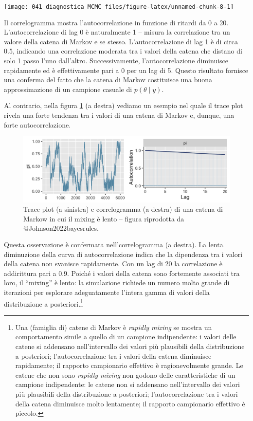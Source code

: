 \documentclass[
  11pt,
  italian,
  a4paper,
  extrafontsizes,onecolumn,openright
  ]{memoir}
\begin{document}
\begin{center}\texttt{[image: 041\_diagnostica\_MCMC\_files/figure-latex/unnamed-chunk-8-1]} \end{center}

Il correlogramma mostra l'autocorrelazione in funzione di ritardi da 0 a 20. L'autocorrelazione di lag 0 è naturalmente 1 -- misura la correlazione tra un valore della catena di Markov e se stesso. L'autocorrelazione di lag 1 è di circa 0.5, indicando una correlazione moderata tra i valori della catena che distano di solo 1 passo l'uno dall'altro. Successivamente, l'autocorrelazione diminuisce rapidamente ed è effettivamente pari a 0 per un lag di 5. Questo risultato fornisce una conferma del fatto che la catena di Markov costituisce una buona approssimazione di un campione casuale di \(p(\theta \mid y)\).

Al contrario, nella figura \ref{fig:bad-autocorrelation} (a destra) \autocite[riprodotta da][]{Johnson2022bayesrules} vediamo un esempio nel quale il trace plot rivela una forte tendenza tra i valori di una catena di Markov e, dunque, una forte autocorrelazione.

\begin{figure}

{\centering \includegraphics[width=32.81in]{images/ch6-acf-2-1} 

}

\caption{Trace plot (a sinistra) e correlogramma (a destra) di una catena di Markow in cui il mixing è lento -- figura riprodotta da @Johnson2022bayesrules.}\label{fig:bad-autocorrelation}
\end{figure}

Questa osservazione è confermata nell'correlogramma (a destra). La lenta diminuzione della curva di autocorrelazione indica che la dipendenza tra i valori della catena non svanisce rapidamente. Con un lag di 20 la correlazione è addirittura pari a 0.9. Poiché i valori della catena sono fortemente associati tra loro, il ``mixing'' è lento: la simulazione richiede un numero molto grande di iterazioni per esplorare adeguatamente l'intera gamma di valori della distribuzione a posteriori.\footnote{Una (famiglia di) catene di Markov è \emph{rapidly mixing} se mostra un comportamento simile a quello di un campione indipendente: i valori delle catene si addensano nell'intervallo dei valori più plausibili della distribuzione a posteriori; l'autocorrelazione tra i valori della catena diminuisce rapidamente; il rapporto campionario effettivo è ragionevolmente grande. Le catene che non sono \emph{rapidly mixing} non godono delle caratteristiche di un campione indipendente: le catene non si addensano nell'intervallo dei valori più plausibili della distribuzione a posteriori; l'autocorrelazione tra i valori della catena diminuisce molto lentamente; il rapporto campionario effettivo è piccolo.}
\end{document}
